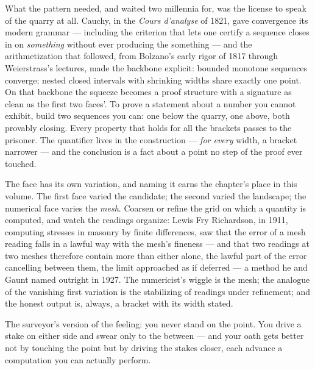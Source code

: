 What the pattern needed, and waited two millennia for, was the license
to speak of the quarry at all. Cauchy, in the \emph{Cours d'analyse} of
1821, gave convergence its modern grammar --- including the criterion
that lets one certify a sequence closes in on \emph{something} without
ever producing the something --- and the arithmetization that followed,
from Bolzano's early rigor of 1817 through Weierstrass's lectures, made
the backbone explicit: bounded monotone sequences converge; nested
closed intervals with shrinking widths share exactly one point. On that
backbone the squeeze becomes a proof structure with a signature as
clean as the first two faces'. To prove a statement about a number you
cannot exhibit, build two sequences you can: one below the quarry, one
above, both provably closing. Every property that holds for all the
brackets passes to the prisoner. The quantifier lives in the
construction --- \emph{for every} width, a bracket narrower --- and the
conclusion is a fact about a point no step of the proof ever touched.

The face has its own variation, and naming it earns the chapter's place
in this volume. The first face varied the candidate; the second varied
the landscape; the numerical face varies the \emph{mesh}. Coarsen or
refine the grid on which a quantity is computed, and watch the readings
organize: Lewis Fry Richardson, in 1911, computing stresses in masonry
by finite differences, saw that the error of a mesh reading falls in a
lawful way with the mesh's fineness --- and that two readings at two
meshes therefore contain more than either alone, the lawful part of the
error cancelling between them, the limit approached as if deferred ---
a method he and Gaunt named outright in 1927. The numericist's wiggle
is the mesh; the analogue of the vanishing first variation is the
stabilizing of readings under refinement; and the honest output is,
always, a bracket with its width stated.

\begin{intuition}
The surveyor's version of the feeling: you never stand on the point.
You drive a stake on either side and swear only to the between --- and
your oath gets better not by touching the point but by driving the
stakes closer, each advance a computation you can actually perform.
\end{intuition}

